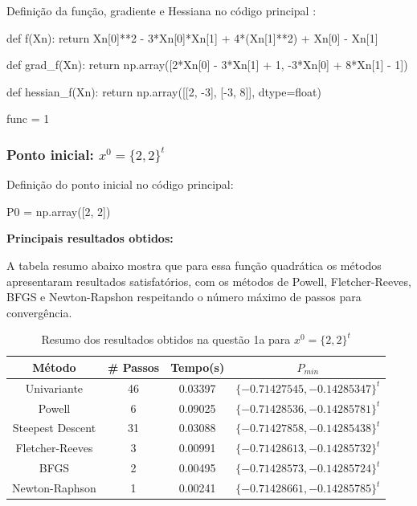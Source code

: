 \documentclass[10pt, a4paper]{article}
\begin{document}
\vspace{5mm}

Definição da função, gradiente e Hessiana no código principal :

\begin{python}
  def f(Xn):
    return Xn[0]**2 - 3*Xn[0]*Xn[1] + 4*(Xn[1]**2) + Xn[0] - Xn[1]
    
  def grad_f(Xn):
      return np.array([2*Xn[0] - 3*Xn[1] + 1, -3*Xn[0] + 8*Xn[1] - 1])
      
  def hessian_f(Xn):
      return np.array([[2, -3],
                      [-3, 8]], dtype=float)
    
  func = 1
\end{python}


\subsubsection{Ponto inicial: $x^0 = \{2,2\}^t $}
Definição do ponto inicial no código principal:
\begin{python}
  P0 = np.array([2, 2])
\end{python}

\vspace{3mm}
\textbf{Principais resultados obtidos: }

\vspace{3mm}
A tabela resumo abaixo mostra que para essa função quadrática os métodos apresentaram resultados satisfatórios,
com os métodos de Powell, Fletcher-Reeves, BFGS e Newton-Rapshon respeitando o número máximo de passos para convergência.

\begin{table}[H]
  \begin{center}
    \begin{tabular}{c|c|c|c}
      \textbf{Método} & \textbf{\# Passos} & \textbf{Tempo(s)} & \textbf{$P_{min}$}\\
      \hline
      Univariante & 46 & 0.03397 & $\{-0.71427545, -0.14285347\}^t$\\
      Powell & 6 & 0.09025 & $\{-0.71428536, -0.14285781\}^t$\\
      Steepest Descent & 31 & 0.03088 & $\{-0.71427858, -0.14285438\}^t$\\
      Fletcher-Reeves & 3 & 0.00991 & $\{-0.71428613, -0.14285732\}^t$\\
      BFGS & 2 & 0.00495 & $\{-0.71428573, -0.14285724\}^t$\\
      Newton-Raphson & 1 & 0.00241 & $\{-0.71428661, -0.14285785\}^t$\\
    \end{tabular}
  \end{center}
  \caption{Resumo dos resultados obtidos na questão 1a para $x^0 = \{2,2\}^t$}
\end{table}
\end{document}
